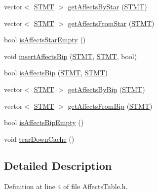 \begin{DoxyCompactItemize}
\item 
vector$<$ \hyperlink{std_afx_8h_a4a876b28ac3f59cecb39c2d2d76e4e7a}{S\-T\-M\-T} $>$ \hyperlink{class_affects_table_a3f6c25a4c9c12e909bcb6050fc023306}{get\-Affects\-By\-Star} (\hyperlink{std_afx_8h_a4a876b28ac3f59cecb39c2d2d76e4e7a}{S\-T\-M\-T})
\item 
vector$<$ \hyperlink{std_afx_8h_a4a876b28ac3f59cecb39c2d2d76e4e7a}{S\-T\-M\-T} $>$ \hyperlink{class_affects_table_a6552df04dccc0ac2caf4354f19f06693}{get\-Affects\-From\-Star} (\hyperlink{std_afx_8h_a4a876b28ac3f59cecb39c2d2d76e4e7a}{S\-T\-M\-T})
\item 
bool \hyperlink{class_affects_table_a1ba999f834dc95da5a93c537a8752283}{is\-Affects\-Star\-Empty} ()
\item 
void \hyperlink{class_affects_table_a500f051fa0b815b43b9ea66ff6b155aa}{insert\-Affects\-Bip} (\hyperlink{std_afx_8h_a4a876b28ac3f59cecb39c2d2d76e4e7a}{S\-T\-M\-T}, \hyperlink{std_afx_8h_a4a876b28ac3f59cecb39c2d2d76e4e7a}{S\-T\-M\-T}, bool)
\item 
bool \hyperlink{class_affects_table_ae78bf0c2e0c1d40f5f05bb4447cb468f}{is\-Affects\-Bip} (\hyperlink{std_afx_8h_a4a876b28ac3f59cecb39c2d2d76e4e7a}{S\-T\-M\-T}, \hyperlink{std_afx_8h_a4a876b28ac3f59cecb39c2d2d76e4e7a}{S\-T\-M\-T})
\item 
vector$<$ \hyperlink{std_afx_8h_a4a876b28ac3f59cecb39c2d2d76e4e7a}{S\-T\-M\-T} $>$ \hyperlink{class_affects_table_a8bdf33012863fe8191d2653e6b83d8ab}{get\-Affects\-By\-Bip} (\hyperlink{std_afx_8h_a4a876b28ac3f59cecb39c2d2d76e4e7a}{S\-T\-M\-T})
\item 
vector$<$ \hyperlink{std_afx_8h_a4a876b28ac3f59cecb39c2d2d76e4e7a}{S\-T\-M\-T} $>$ \hyperlink{class_affects_table_a0fb5f47d95cc4b4630e49e456044976b}{get\-Affects\-From\-Bip} (\hyperlink{std_afx_8h_a4a876b28ac3f59cecb39c2d2d76e4e7a}{S\-T\-M\-T})
\item 
bool \hyperlink{class_affects_table_aa327f4b862a60ad35efc762198177a91}{is\-Affects\-Bip\-Empty} ()
\item 
void \hyperlink{class_affects_table_a0ea66213d38d932c110f3f3e69560aa9}{tear\-Down\-Cache} ()
\end{DoxyCompactItemize}


\subsection{Detailed Description}


Definition at line 4 of file Affects\-Table.\-h.



